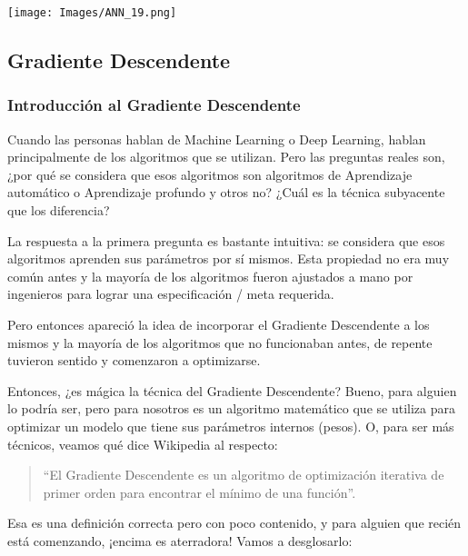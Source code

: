 \documentclass[
]{book}
\begin{document}
\texttt{[image: Images/ANN\_19.png]}

\hypertarget{gradiente-descendente}{%
\subsection{Gradiente Descendente}\label{gradiente-descendente}}

\hypertarget{introducciuxf3n-al-gradiente-descendente}{%
\subsubsection{Introducción al Gradiente Descendente}\label{introducciuxf3n-al-gradiente-descendente}}

Cuando las personas hablan de Machine Learning o Deep Learning, hablan principalmente de los algoritmos que se utilizan. Pero las preguntas reales son, ¿por qué se considera que esos algoritmos son algoritmos de Aprendizaje automático o Aprendizaje profundo y otros no? ¿Cuál es la técnica subyacente que los diferencia?

La respuesta a la primera pregunta es bastante intuitiva: se considera que esos algoritmos aprenden sus parámetros por sí mismos. Esta propiedad no era muy común antes y la mayoría de los algoritmos fueron ajustados a mano por ingenieros para lograr una especificación / meta requerida.

Pero entonces apareció la idea de incorporar el Gradiente Descendente a los mismos y la mayoría de los algoritmos que no funcionaban antes, de repente tuvieron sentido y comenzaron a optimizarse.

Entonces, ¿es mágica la técnica del Gradiente Descendente? Bueno, para alguien lo podría ser, pero para nosotros es un algoritmo matemático que se utiliza para optimizar un modelo que tiene sus parámetros internos (pesos). O, para ser más técnicos, veamos qué dice Wikipedia al respecto:

\begin{quote}
``El Gradiente Descendente es un algoritmo de optimización iterativa de primer orden para encontrar el mínimo de una función''.
\end{quote}

Esa es una definición correcta pero con poco contenido, y para alguien que recién está comenzando, ¡encima es aterradora! Vamos a desglosarlo:
\end{document}
